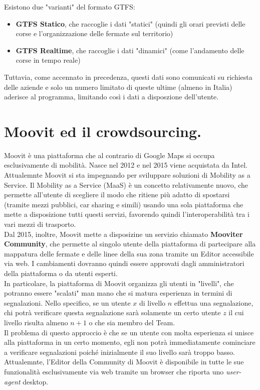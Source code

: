     Esistono due "varianti" del formato GTFS:
    \begin{itemize}
        \item \textbf{GTFS Statico}, che raccoglie i dati "statici" (quindi gli orari previsti delle corse e l'organizzazione delle fermate sul territorio)
        \item \textbf{GTFS Realtime}, che raccoglie i dati "dinamici" (come l'andamento delle corse in tempo reale)
    \end{itemize}

    Tuttavia, come accennato in precedenza, questi dati sono comunicati su richiesta delle aziende e solo un numero limitato di queste ultime (almeno in Italia) aderisce al programma, limitando così i dati a disposzione dell'utente.

\section{Moovit ed il crowdsourcing.}
    Moovit è una piattaforma che al contrario di Google Maps si occupa esclusivamente di mobilità.
    Nasce nel 2012 e nel 2015 viene acquistata da Intel. Attualemnte Moovit si sta impegnando per sviluppare soluzioni di Mobility as a Service.
    Il Mobility as a Service (MaaS) è un concetto relativamente nuovo, che permette all'utente di scegliere il modo che ritiene più adatto di spostarsi (tramite mezzi pubblici, car sharing e simili) usando una sola piattaforma che mette a disposizione tutti questi servizi, favorendo quindi l'interoperabilità tra i vari mezzi di trasporto. \\

    Dal 2015, inoltre, Moovit mette a disposizine un servizio chiamato \textbf{Mooviter Community}, che permette al singolo utente della piattaforma di partecipare alla mappatura delle fermate e delle linee della sua zona tramite un Editor accessibile via web. I cambiamenti dovranno quindi essere approvati dagli amministratori della piattaforma o da utenti esperti. \\

    In particolare, la piattaforma di Moovit organizza gli utenti in "livelli", che potranno essere "scalati" man mano che si matura esperienza in termini di segnalazioni. Nello specifico, se un utente $x$ di livello $n$ effettua una segnalazione, chi potrà verificare questa segnalazione sarà solamente un certo utente $z$ il cui livello risulta almeno $n + 1$ o che sia membro del Team. \\
    Il problema di questo approccio è che se un utente con molta esperienza si unisce alla piattaforma in un certo momento, egli non potrà immediatamente cominciare a verificare segnalazioni poiché inizialmente il suo livello sarà troppo basso.\\
    Attualemnte, l'Editor della Community di Moovit è disponibile in tutte le sue funzionalità esclusivamente via web tramite un browser che riporta uno \textit{user-agent} desktop. \\

